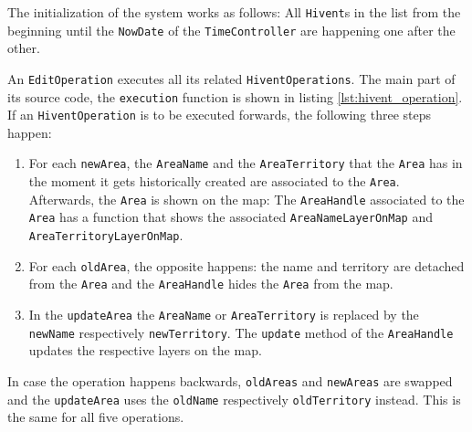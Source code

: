 The initialization of the system works as follows: All \texttt{Hivent}s in the list from the beginning until the \texttt{NowDate} of the \texttt{TimeController} are happening one after the other.

An \texttt{EditOperation} executes all its related \texttt{HiventOperations}. The main part of its source code, the \texttt{execution} function is shown in listing \ref{lst:hivent_operation}. If an \texttt{HiventOperation} is to be executed forwards, the following three steps happen:

\begin{enumerate}
  \item For each \texttt{newArea}, the \texttt{AreaName} and the \texttt{AreaTerritory} that the \texttt{Area} has in the moment it gets historically created are associated to the \texttt{Area}. Afterwards, the \texttt{Area} is shown on the map: The \texttt{AreaHandle} associated to the \texttt{Area} has a function that shows the associated \texttt{AreaNameLayerOnMap} and \texttt{AreaTerritoryLayerOnMap}.
  \item For each \texttt{oldArea}, the opposite happens: the name and territory are detached from the \texttt{Area} and the \texttt{AreaHandle} hides the \texttt{Area} from the map.
  \item In the \texttt{updateArea} the \texttt{AreaName} or \texttt{AreaTerritory} is replaced by the \texttt{newName} respectively \texttt{newTerritory}. The \texttt{update} method of the \texttt{AreaHandle} updates the respective layers on the map.
\end{enumerate}

In case the operation happens backwards, \texttt{oldAreas} and \texttt{newAreas} are swapped and the \texttt{updateArea} uses the \texttt{oldName} respectively \texttt{oldTerritory} instead. This is the same for all five operations.

